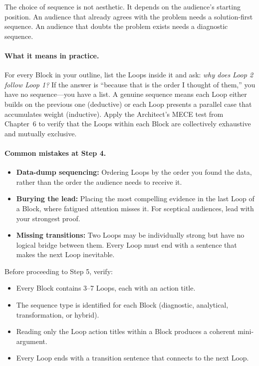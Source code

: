 The choice of sequence is not aesthetic. It depends on the audience's starting position. An audience that already agrees with the problem needs a solution-first sequence. An audience that doubts the problem exists needs a diagnostic sequence.

\paragraph{What it means in practice.} For every Block in your outline, list the Loops inside it and ask: \emph{why does Loop 2 follow Loop 1?} If the answer is ``because that is the order I thought of them,'' you have no sequence---you have a list. A genuine sequence means each Loop either builds on the previous one (deductive) or each Loop presents a parallel case that accumulates weight (inductive). Apply the Architect's MECE test from Chapter~6 to verify that the Loops within each Block are collectively exhaustive and mutually exclusive.

\paragraph{Common mistakes at Step 4.}
\begin{itemize}
  \item \textbf{Data-dump sequencing:} Ordering Loops by the order you found the data, rather than the order the audience needs to receive it.
  \item \textbf{Burying the lead:} Placing the most compelling evidence in the last Loop of a Block, where fatigued attention misses it. For sceptical audiences, lead with your strongest proof.
  \item \textbf{Missing transitions:} Two Loops may be individually strong but have no logical bridge between them. Every Loop must end with a sentence that makes the next Loop inevitable.
\end{itemize}

\begin{keybox}
Before proceeding to Step 5, verify:
\begin{itemize}[leftmargin=1.2em]
  \item Every Block contains 3--7 Loops, each with an action title.
  \item The sequence type is identified for each Block (diagnostic, analytical, transformation, or hybrid).
  \item Reading only the Loop action titles within a Block produces a coherent mini-argument.
  \item Every Loop ends with a transition sentence that connects to the next Loop.
\end{itemize}
\end{keybox}

